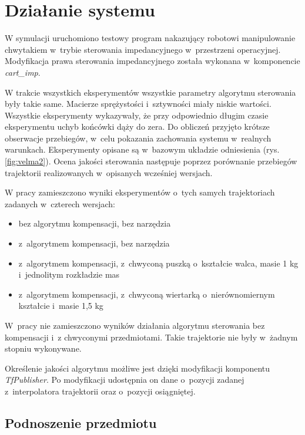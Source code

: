 
\chapter{Działanie systemu\label{chap:weryfikacja_systemu}}
\graphicspath{{../../velma/przerobione_testy/out/}{./images}}

W symulacji uruchomiono testowy program  nakazujący robotowi manipulowanie chwytakiem w~trybie sterowania impedancyjnego w~przestrzeni operacyjnej.  Modyfikacja prawa sterowania impedancyjnego została wykonana w~komponencie \textit{cart\_imp}.  

W trakcie wszystkich eksperymentów wszystkie parametry algorytmu sterowania były takie same. Macierze sprężystości i~sztywności miały niskie wartości.  Wszystkie eksperymenty wykazywały, że przy odpowiednio długim czasie eksperymentu uchyb końcówki dąży do zera. Do obliczeń przyjęto krótsze obserwacje przebiegów, w~celu pokazania zachowania systemu w~realnych warunkach.  Eksperymenty opisane są w~bazowym układzie odniesienia (rys. \ref{fig:velma2}).  Ocena jakości sterowania następuje poprzez porównanie przebiegów trajektorii realizowanych w~opisanych wcześniej wersjach.

W pracy zamieszczono wyniki eksperymentów o~tych samych trajektoriach zadanych w~czterech wersjach:
\begin{itemize}
	\item bez algorytmu kompensacji, bez narzędzia
	\item z~algorytmem kompensacji, bez narzędzia
	\item z~algorytmem kompensacji, z~chwyconą puszką o~kształcie walca, masie 1 kg i~jednolitym rozkładzie mas
	\item z~algorytmem kompensacji, z~chwyconą wiertarką o~nierównomiernym kształcie i~masie 1,5 kg
\end{itemize}
 W~pracy nie zamieszczono wyników działania algorytmu sterowania bez kompensacji i~z chwyconymi przedmiotami. Takie trajektorie nie były  w~żadnym stopniu wykonywane. 
 
Określenie jakości algorytmu możliwe jest dzięki modyfikacji komponentu \textit{TfPublisher}. Po modyfikacji udostępnia on dane o~pozycji zadanej z~interpolatora trajektorii oraz o~pozycji osiągniętej. 


\section{Podnoszenie przedmiotu}

